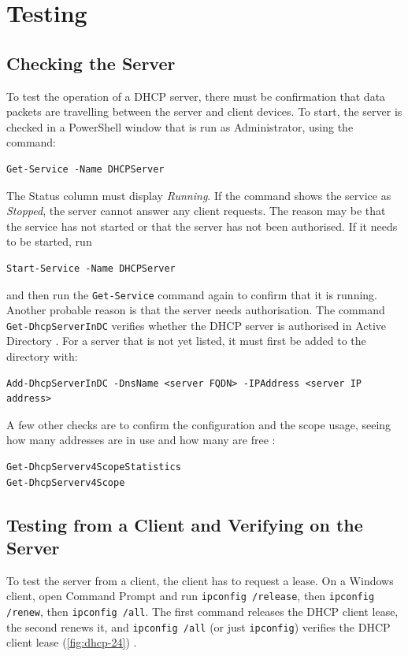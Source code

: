 \section{Testing}
\label{sec:dhcp-testing}

\subsection{Checking the Server}
\label{sec:dhcp-checkserver}
To test the operation of a DHCP server, there must be confirmation that data packets are travelling between the server and client devices. To start, the server is checked in a PowerShell window that is run as Administrator, using the command:

\begin{lstlisting}
Get-Service -Name DHCPServer
\end{lstlisting}

The Status column must display \emph{Running}. If the command shows the service as \emph{Stopped}, the server cannot answer any client requests. The reason may be that the service has not started or that the server has not been authorised. If it needs to be started, run

\begin{lstlisting}
Start-Service -Name DHCPServer
\end{lstlisting}

and then run the \texttt{Get-Service} command again to confirm that it is running. Another probable reason is that the server needs authorisation. The command \texttt{Get-DhcpServerInDC} verifies whether the DHCP server is authorised in Active Directory \cite{msft-dhcp-quickstart}. For a server that is not yet listed, it must first be added to the directory with:

\begin{lstlisting}
Add-DhcpServerInDC -DnsName <server FQDN> -IPAddress <server IP address>
\end{lstlisting}

A few other checks are to confirm the configuration and the scope usage, seeing how many addresses are in use and how many are free \cite{msft-dhcp-quickstart}:

\begin{lstlisting}
Get-DhcpServerv4ScopeStatistics
Get-DhcpServerv4Scope
\end{lstlisting}

\subsection{Testing from a Client and Verifying on the Server}
\label{sec:dhcp-testclient}
To test the server from a client, the client has to request a lease. On a Windows client, open Command Prompt and run \texttt{ipconfig /release}, then \texttt{ipconfig /renew}, then \texttt{ipconfig /all}. The first command releases the DHCP client lease, the second renews it, and \texttt{ipconfig /all} (or just \texttt{ipconfig}) verifies the DHCP client lease (\autoref{fig:dhcp-24}) \cite{msft-dhcp-renew}.

